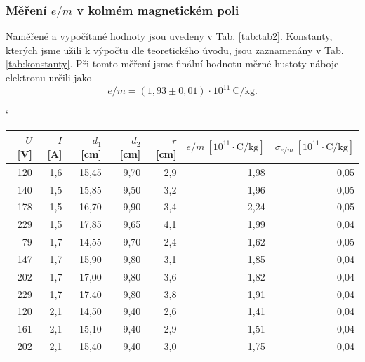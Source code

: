 \documentclass[english]{article}
\begin{document}
		\subsubsection{Měření $e/m$ v kolmém magnetickém poli}
			Naměřené a vypočítané hodnoty jsou uvedeny v Tab. \ref{tab:tab2}. Konstanty, kterých jsme užili k výpočtu dle teoretického úvodu, jsou zaznamenány v Tab. \ref{tab:konstanty}. Při tomto měření jsme finální hodnotu měrné hustoty náboje elektronu určili jako 
			\begin{equation}
				e/m = (1,93\pm0,01)~\mathrm{\cdot~10^{11}~C/kg}.
			\end{equation}	

\begin{table}[htbp]
\catcode` %
  \centering
  \begin{tabular}{|r|r|r|r|r|r|r|}
  \hline
  \boldmath{}\textbf{$U$ [V]}\unboldmath{} & \boldmath{}\textbf{$I$ [A]}\unboldmath{} & \boldmath{}\textbf{$d_1$ [cm]}\unboldmath{} & \boldmath{}\textbf{$d_2$ [cm]}\unboldmath{} & \boldmath{}\textbf{$r$ [cm]}\unboldmath{} & \boldmath{}\textbf{$e/m~\mathrm{[10^{11}\cdot C/kg]}$}\unboldmath{} & \boldmath{}\textbf{$\sigma_{e/m}~\mathrm{[10^{11}\cdot C/kg]}$}\unboldmath{} \bigstrut\\
  \hline
  120   & 1,6   & 15,45 & 9,70  & 2,9   & 1,98  & 0,05 \bigstrut\\
  \hline
  140   & 1,5   & 15,85 & 9,50  & 3,2   & 1,96  & 0,05 \bigstrut\\
  \hline
  178   & 1,5   & 16,70 & 9,90  & 3,4   & 2,24  & 0,05 \bigstrut\\
  \hline
  229   & 1,5   & 17,85 & 9,65  & 4,1   & 1,99  & 0,04 \bigstrut\\
  \hline
  79    & 1,7   & 14,55 & 9,70  & 2,4   & 1,62  & 0,05 \bigstrut\\
  \hline
  147   & 1,7   & 15,90 & 9,80  & 3,1   & 1,85  & 0,04 \bigstrut\\
  \hline
  202   & 1,7   & 17,00 & 9,80  & 3,6   & 1,82  & 0,04 \bigstrut\\
  \hline
  229   & 1,7   & 17,40 & 9,80  & 3,8   & 1,91  & 0,04 \bigstrut\\
  \hline
  120   & 2,1   & 14,50 & 9,40  & 2,6   & 1,41  & 0,04 \bigstrut\\
  \hline
  161   & 2,1   & 15,10 & 9,40  & 2,9   & 1,51  & 0,04 \bigstrut\\
  \hline
  202   & 2,1   & 15,40 & 9,40  & 3,0   & 1,75  & 0,04 \bigstrut\\

\end{tabular}
\end{table}
\end{document}

